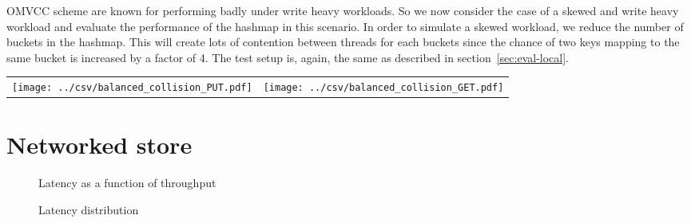 OMVCC scheme are known for performing badly under write heavy
workloads. So we now consider the case of a skewed and write heavy
workload and evaluate the performance of the hashmap in this
scenario. In order to simulate a skewed workload, we reduce the number
of buckets in the hashmap. This will create lots of contention between
threads for each buckets since the chance of two keys mapping to the
same bucket is increased by a factor of 4. The test setup is, again,
the same as described in section~\ref{sec:eval-local}.

\begin{center}
  \begin{tabular}{c c} \label{table:col-balanced}
    \texttt{[image: ../csv/balanced\_collision\_PUT.pdf]}
    &
      \texttt{[image: ../csv/balanced\_collision\_GET.pdf]}
  \end{tabular}
\end{center}

\section{Networked store}

\begin{figure}[htb!]
  \caption{Latency as a function of throughput}
  \label{fig:latency-throughput}
\end{figure}

\begin{figure}[htb!]
  \caption{Latency distribution}
  \label{fig:latency-distribution}
\end{figure}

